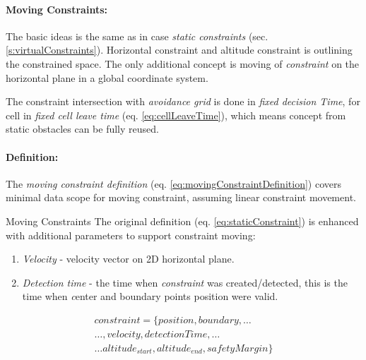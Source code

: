 \paragraph{Moving Constraints:} The basic ideas is the same as in case \emph{static constraints} (sec. \ref{s:virtualConstraints}). Horizontal constraint and altitude constraint is outlining the constrained space. The only additional concept is moving of \emph{constraint} on the horizontal plane in a global coordinate system. 

The constraint intersection  with \emph{avoidance grid} is done in \emph{fixed decision Time}, for cell in \emph{fixed cell leave time} (eq. \ref{eq:cellLeaveTime}), which means concept from static obstacles can be fully reused.


\paragraph{Definition:} The \emph{moving constraint definition} (eq. \ref{eq:movingConstraintDefinition}) covers minimal data scope for  moving constraint, assuming linear constraint movement. 


\begin{definition}{Moving Constraints}\label{def:movingConstraint}
The original definition (eq. \ref{eq:staticConstraint}) is enhanced with additional parameters to support constraint moving:

\begin{enumerate}
    \item \emph{Velocity} - velocity vector on 2D horizontal plane.
    
    \item \emph{Detection time} - the time when \emph{constraint} was created/detected, this is the time when \emph center and boundary points position were valid.
\end{enumerate}

\begin{multline}\label{eq:movingConstraintDefinition}
    constraint = \{position,boundary,\dots\\\dots, velocity, detection Time, \dots \\\dots altitude_{start},altitude_{end}, safety Margin\}
\end{multline}

\end{definition}
